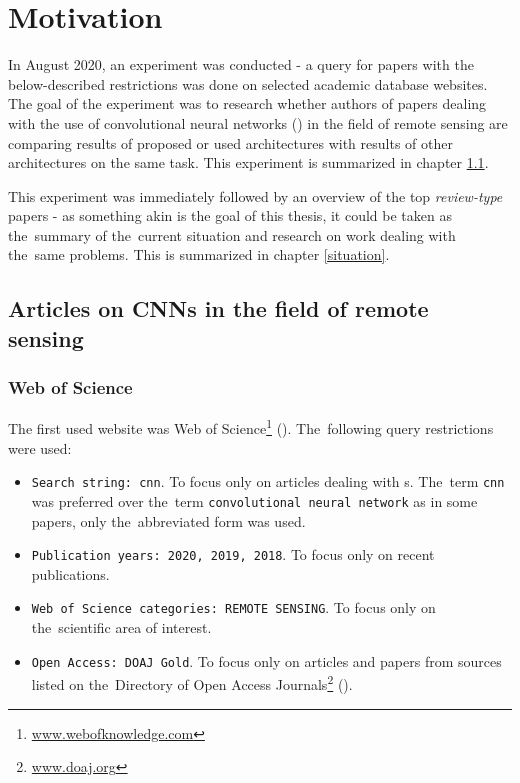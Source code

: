 \chapter{Motivation}
\label{motivation}

In August 2020, an experiment was conducted - a query for papers with the below-described restrictions was done on selected academic database websites. The goal of the experiment was to research whether authors of papers dealing with the use of convolutional neural networks () in the field of remote sensing are comparing results of proposed or used architectures with results of other architectures on the same task. This experiment is summarized in chapter \ref{top-papers}.

This experiment was immediately followed by an overview of the top \textit{review-type} papers - as something akin is the goal of this thesis, it could be taken as the~summary of the~current situation and research on work dealing with the~same problems. This is summarized in chapter \ref{situation}.

\section{Articles on CNNs in the field of remote sensing}
\label{top-papers}

\subsection{Web of Science}
\label{wos-papers}

The first used website was Web of Science\footnote{\url{www.webofknowledge.com}} (). The~following query restrictions were used:

\begin{itemize}
	\item \verb|Search string: cnn|. To focus only on articles dealing with s. The~term \verb|cnn| was preferred over the~term \verb|convolutional neural network| as in some papers, only the~abbreviated form was used.
	\item \verb|Publication years: 2020, 2019, 2018|. To focus only on recent publications.
	\item \verb|Web of Science categories: REMOTE SENSING|. To focus only on the~scien\-ti\-fic area of interest.
	\item \verb|Open Access: DOAJ Gold|. To focus only on articles and papers from sources listed on the~Di\-rectory of Open Access Journals\footnote{\url{www.doaj.org}} ().
\end{itemize}

